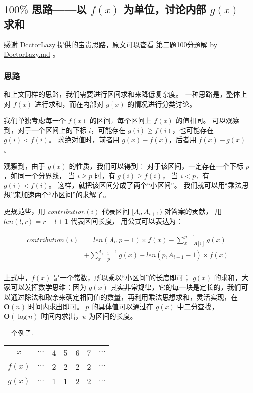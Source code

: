 \subsection{\texorpdfstring{$100\%$}{100\%} 思路——以 \texorpdfstring{$f(x)$}{f(x)} 为单位，讨论内部 \texorpdfstring{$g(x)$}{g(x)} 求和}

感谢 \href{https://github.com/DoctorLazy}{DoctorLazy}
提供的宝贵思路，原文可以查看 \href{https://github.com/DoctorLazy}{第二题100分题解 by DoctorLazy.md}
。

\subsubsection{思路}

和上文同样的思路，我们需要进行区间求和来降低复杂度。
一种思路是，整体上对 $f(x)$ 进行求和，而在内部对 $g(x)$ 的情况进行分类讨论。

我们单独考虑每一个 $f(x)$ 的区间，每个区间上 $f(x)$ 的值相同。
可以观察到，对于一个区间上的下标 $i$，可能存在 $g(i)\ge f(i)$，也可能存在 $g(i)<f(i)$。
求绝对值时，前者用 $g(x)-f(x)$，后者用 $f(x)-g(x)$。

观察到，由于 $g(x)$ {}的性质，我们可以得到：
对于该区间，一定存在一个下标 $p$，如同一个分界线，
当 $i\ge p$ 时，有 $g(i)\ge f(i)$，
当 $i<p$，有 $g(i)<f(i)$。
这样，就把该区间分成了两个“小区间”。
我们就可以用“乘法思想”来加速两个“小区间”的求解了。

更规范些，用 $contribution(i)$ 代表区间 $[A_i, A_{i+1})$ 对答案的贡献，
用 $len(l, r) = r - l + 1$ 代表区间长度，
用公式可以表达为：

\begin{align*}
  contribution(i) & =len(A_i,p-1)\times f(x)-\sum_{x=A[i]}^{p-1}g(x)         \\
                  & +\sum_{x=p}^{A_{i+1}-1}g(x)- len(p,A_{i+1}-1)\times f(x) \\
\end{align*}

上式中，$f(x)$ 是一个常数，所以乘以“小区间”的长度即可；
$g(x)$ 的求和，大家可以发挥数学思维：因为 $g(x)$ 其实非常规律，它的每一块是定长的，我们可以通过除法和取余来确定相同值的数量，再利用乘法思想求和，灵活实现，在 $\mathbf{O}(n)$ 时间内求出即可。
$p$ 的具体值可以通过在 $g(x)$ 中二分查找，$\mathbf{O}(\log n)$ 时间内求出，$n$ 为区间的长度。

一个例子:

\begin{table}[H]
  \centering
  \begin{tabular}{ccccccc}
    \toprule
    $x$    & $\cdots$ & 4 & 5 & 6 & 7 & $\cdots$ \\
    $f(x)$ & $\cdots$ & 2 & 2 & 2 & 2 & $\cdots$ \\
    $g(x)$ & $\cdots$ & 1 & 1 & 2 & 2 & $\cdots$ \\
    \bottomrule
  \end{tabular}
\end{table}

